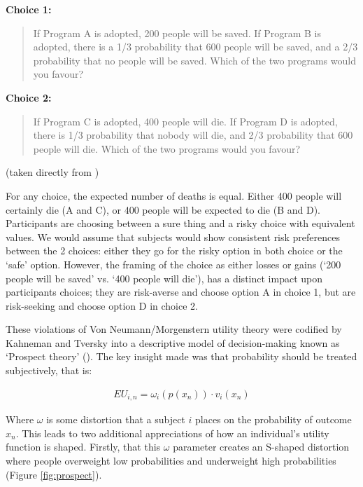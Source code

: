 \vspace{0.5em}

\textbf{Choice 1:}

\begin{quote}
If Program A is adopted, 200 people will be saved. If Program B is adopted, there is a 1/3 probability that 600 people will be saved, and a 2/3 probability that no people will be saved. Which of the two programs would you favour?
\end{quote}

\vspace{0.5em}

\textbf{Choice 2:}

\begin{quote}
If Program C is adopted, 400 people will die. If Program D is adopted, there is 1/3 probability that nobody will die, and 2/3 probability that 600 people will die. Which of the two programs would you favour?
\end{quote}

(taken directly from \cite{tverskyFramingDecisionsPsychology1981})

For any choice, the expected number of deaths is equal. Either 400 people will certainly die (A and C), or 400 people will be expected to die (B and D). Participants are choosing between a sure thing and a risky choice with equivalent values. We would assume that subjects would show consistent risk preferences between the 2 choices: either they go for the risky option in both choice or the ‘safe’ option. However, the framing of the choice as either losses or gains (‘200 people will be saved’ vs. ‘400 people will die’), has a distinct impact upon participants choices; they are risk-averse and choose option A in choice 1, but are risk-seeking and choose option D in choice 2.

These violations of Von Neumann/Morgenstern utility theory were codified by Kahneman and Tversky into a descriptive model of decision-making known as ‘Prospect theory’ (\cite{kahnemanProspectTheoryAnalysis1979}). The key insight made was that probability should be treated subjectively, that is:

\begin{align}
EU_{i,n} = \omega_i(p(x_n)) \cdot v_i(x_n)
\label{eq:utility_probability}
\end{align}

Where $\omega$ is some distortion that a subject $i$ places on the probability of outcome $x_n$. This leads to two additional appreciations of how an individual’s utility function is shaped. Firstly, that this $\omega$ parameter creates an S-shaped distortion where people overweight low probabilities and underweight high probabilities (Figure \ref{fig:prospect}).

